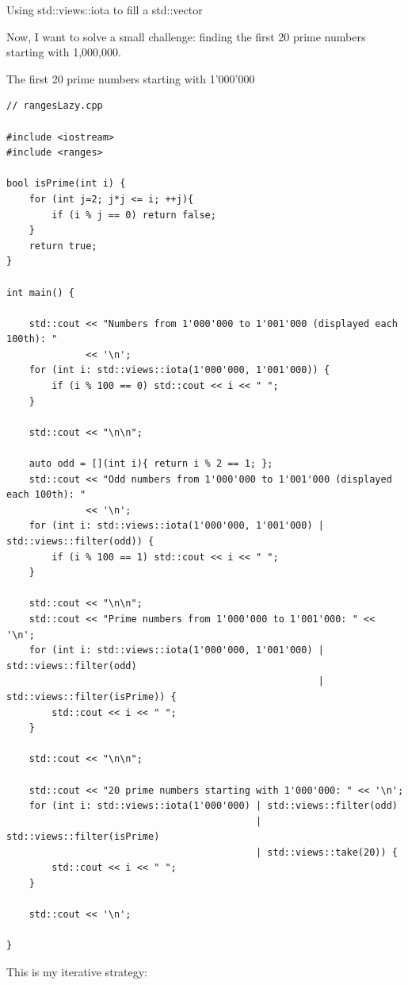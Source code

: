 \begin{center}
Using std::views::iota to fill a std::vector
\end{center}

Now, I want to solve a small challenge: finding the first 20 prime numbers starting with 1,000,000.

\noindent
The first 20 prime numbers starting with 1’000’000
\begin{lstlisting}[style=styleCXX]
// rangesLazy.cpp

#include <iostream>
#include <ranges>

bool isPrime(int i) {
	for (int j=2; j*j <= i; ++j){
		if (i % j == 0) return false;
	}
	return true;
}

int main() {
	
	std::cout << "Numbers from 1'000'000 to 1'001'000 (displayed each 100th): "
	          << '\n';
	for (int i: std::views::iota(1'000'000, 1'001'000)) {
		if (i % 100 == 0) std::cout << i << " ";
	}
	
	std::cout << "\n\n";
	
	auto odd = [](int i){ return i % 2 == 1; };
	std::cout << "Odd numbers from 1'000'000 to 1'001'000 (displayed each 100th): "
	          << '\n';
	for (int i: std::views::iota(1'000'000, 1'001'000) | std::views::filter(odd)) {
		if (i % 100 == 1) std::cout << i << " ";
	}
	
	std::cout << "\n\n";
	std::cout << "Prime numbers from 1'000'000 to 1'001'000: " << '\n';
	for (int i: std::views::iota(1'000'000, 1'001'000) | std::views::filter(odd)
	                                                   | std::views::filter(isPrime)) {
		std::cout << i << " ";
	}
	
	std::cout << "\n\n";
	
	std::cout << "20 prime numbers starting with 1'000'000: " << '\n';
	for (int i: std::views::iota(1'000'000) | std::views::filter(odd)
	                                        | std::views::filter(isPrime)
	                                        | std::views::take(20)) {
		std::cout << i << " ";
	}
	
	std::cout << '\n';

}
\end{lstlisting}

This is my iterative strategy:


